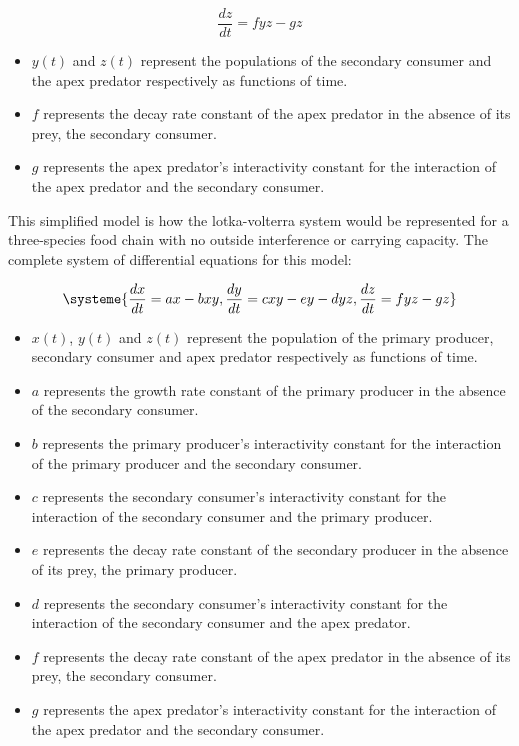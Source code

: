 \documentclass[11pt,oneside]{article}
\begin{document}
	\begin{equation}
	\frac{dz}{dt} = fyz - gz
	\end{equation}
	\begin{itemize}
		\item $y(t)$ and $z(t)$ represent the populations of the secondary consumer and the apex predator respectively as functions of time.
		\item $f$ represents the decay rate constant of the apex predator in the absence of its prey, the secondary consumer.
		\item $g$ represents the apex predator's interactivity constant for the interaction of the apex predator and the secondary consumer.
	\end{itemize}
	
	This simplified model is how the lotka-volterra system would be represented for a three-species food chain with no outside interference or carrying capacity. The complete system of differential equations for this model:
	
	\begin{equation}
	\systeme{
		\frac{dx}{dt} = ax - bxy,
		\frac{dy}{dt} = cxy - ey -dyz,
		\frac{dz}{dt} = fyz - gz
	}
	\end{equation}
	\begin{itemize}
		\item $x(t)$, $y(t)$ and $z(t)$ represent the population of the primary producer, secondary consumer and apex predator respectively as functions of time.
		\item $a$ represents the growth rate constant of the primary producer in the absence of the secondary consumer.
		\item $b$ represents the primary producer's interactivity constant for the interaction of the primary producer and the secondary consumer.
		\item $c$ represents the secondary consumer's interactivity constant for the interaction of the secondary consumer and the primary producer.
		\item $e$ represents the decay rate constant of the secondary producer in the absence of its prey, the primary producer.
		\item $d$ represents the secondary consumer's interactivity constant for the interaction of the secondary consumer and the apex predator.
		\item $f$ represents the decay rate constant of the apex predator in the absence of its prey, the secondary consumer.
		\item $g$ represents the apex predator's interactivity constant for the interaction of the apex predator and the secondary consumer.
	\end{itemize}
	
\end{document}
